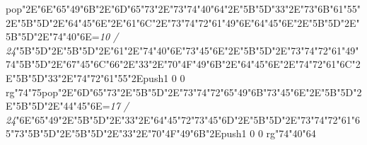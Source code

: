 pop{}\ipa\char"2E\ipa\char"6E\ipa\char"65\ipa\char"49\ipa\char"6B\ipa\char"2E\ipa\char"6D\ipa\char"65\ipa\char"73\ipa\char"2E\ipa\char"73\ipa\char"74\ipa\char"40\ipa\char"64\ipa\char"2E\ipa\char"5B\quad\quad\quad\ipa\char"5D\bigskip\ipa\char"33\ipa\char"2E\ipa\char"73\ipa\char"6B\ipa\char"61\ipa\char"55\ipa\char"2E\ipa\char"5B\quad\quad\ipa\char"5D\ipa\char"2E\ipa\char"64\ipa\char"45\ipa\char"6E\ipa\char"2E\ipa\char"61\ipa\char"6C\ipa\char"2E\ipa\char"73\ipa\char"74\ipa\char"72\ipa\char"61\ipa\char"49\ipa\char"6E\bigskip\ipa\char"64\ipa\char"45\ipa\char"6E\ipa\char"2E\ipa\char"5B\quad\quad\ipa\char"5D\ipa\char"2E\ipa\char"5B\quad\quad\quad\ipa\char"5D\ipa\char"2E\ipa\char"74\ipa\char"40\ipa\char"6E\bigskip\vfill\footline={\hfill\tenrm\it 10 / 24}\eject\null\vfill\ipa\char"5B\quad\quad\quad\ipa\char"5D\ipa\char"2E\ipa\char"5B\quad\quad\quad\quad\ipa\char"5D\ipa\char"2E\ipa\char"61\ipa\char"2E\ipa\char"74\ipa\char"40\ipa\char"6E\bigskip\ipa\char"73\ipa\char"45\ipa\char"6E\ipa\char"2E\ipa\char"5B\quad\quad\quad\ipa\char"5D\ipa\char"2E\ipa\char"73\ipa\char"74\ipa\char"72\ipa\char"61\ipa\char"49\ipa\char"74\bigskip\ipa\char"5B\quad\quad\ipa\char"5D\ipa\char"2E\ipa\char"67\ipa\char"45\ipa\char"6C\ipa\char"66\ipa\char"2E\ipa\char"33\ipa\char"2E\ipa\char"70\ipa\char"4F\ipa\char"49\ipa\char"6B\ipa\char"2E\ipa\char"64\ipa\char"45\ipa\char"6E\ipa\char"2E\ipa\char"74\ipa\char"72\ipa\char"61\ipa\char"6C\ipa\char"2E\ipa\char"5B\quad\quad\quad\ipa\char"5D\bigskip\ipa\char"33\ipa\char"2E\ipa\char"74\ipa\char"72\ipa\char"61\ipa\char"55\ipa\char"2E\pdfcolorstack\match push{1 0 0 rg}\ipa\char"74\ipa\char"75\pdfcolorstack\match pop{}\ipa\char"2E\ipa\char"6D\ipa\char"65\ipa\char"73\ipa\char"2E\ipa\char"5B\quad\quad\ipa\char"5D\ipa\char"2E\ipa\char"73\ipa\char"74\ipa\char"72\ipa\char"65\ipa\char"49\ipa\char"6B\bigskip\ipa\char"73\ipa\char"45\ipa\char"6E\ipa\char"2E\ipa\char"5B\quad\quad\ipa\char"5D\ipa\char"2E\ipa\char"5B\quad\quad\quad\ipa\char"5D\ipa\char"2E\ipa\char"44\ipa\char"45\ipa\char"6E\bigskip\vfill\footline={\hfill\tenrm\it 17 / 24}\eject\null\vfill\ipa\char"6E\ipa\char"65\ipa\char"49\ipa\char"2E\ipa\char"5B\quad\quad\quad\quad\ipa\char"5D\ipa\char"2E\ipa\char"33\ipa\char"2E\ipa\char"64\ipa\char"45\ipa\char"72\bigskip\ipa\char"73\ipa\char"45\ipa\char"6D\ipa\char"2E\ipa\char"5B\quad\quad\quad\ipa\char"5D\ipa\char"2E\ipa\char"73\ipa\char"74\ipa\char"72\ipa\char"61\ipa\char"65\ipa\char"73\bigskip\ipa\char"5B\quad\quad\ipa\char"5D\ipa\char"2E\ipa\char"5B\quad\quad\quad\quad\ipa\char"5D\ipa\char"2E\ipa\char"33\ipa\char"2E\ipa\char"70\ipa\char"4F\ipa\char"49\ipa\char"6B\ipa\char"2E\pdfcolorstack\match push{1 0 0 rg}\ipa\char"74\ipa\char"40\ipa\char"64\pdfcolorstack\match 